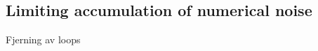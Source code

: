 \subsection{Limiting accumulation of numerical noise}
\label{sub:limiting_accumulation_of_numerical_noise}

\begin{framed}
    Fjerning av loops
\end{framed}
